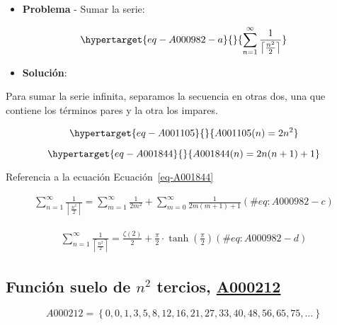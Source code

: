 \documentclass[
  letterpaper,
  DIV=11,
  numbers=noendperiod]{scrreprt}
\providecommand{\tightlist}{%
  \setlength{\itemsep}{0pt}\setlength{\parskip}{0pt}}\usepackage{longtable,booktabs,array}
\begin{document}
\begin{itemize}
\tightlist
\item
  \textbf{Problema} - Sumar la serie:
\end{itemize}

\begin{equation}\protect\hypertarget{eq-A000982-a}{}{
\sum_{n=1}^{\infty}{\frac{1}{\left\lceil  \frac{n^2}{2} \right\rceil}}
}\label{eq-A000982-a}\end{equation}

\begin{itemize}
\tightlist
\item
  \textbf{Solución}:
\end{itemize}

Para sumar la serie infinita, separamos la secuencia en otras dos, una
que contiene los términos pares y la otra los impares.

\begin{equation}\protect\hypertarget{eq-A001105}{}{
A001105(n) = 2n^2
}\label{eq-A001105}\end{equation}

\begin{equation}\protect\hypertarget{eq-A001844}{}{
A001844(n) = 2n(n+1) + 1
}\label{eq-A001844}\end{equation}

Referencia a la ecuación Ecuación~\ref{eq-A001844}

\begin{multline}
\sum_{n=1}^{\infty}{\frac{1}{\left\lceil \frac{n^2}{2} \right\rceil}} =  \sum_{m=1}^{\infty}{\frac{1}{2m^2}}  + \sum_{m=0}^{\infty}{\frac{1}{2m(m+1) + 1}} 
  (\#eq:A000982-c)
\end{multline}

\begin{multline}
\sum_{n=1}^{\infty}{\frac{1}{\left\lceil \frac{n^2}{2} \right\rceil}} =  \frac{\zeta(2)}{2} + \frac{\pi}{2} \cdot \tanh\left(\frac{\pi}{2}\right)
  (\#eq:A000982-d)
\end{multline}

\hypertarget{funciuxf3n-suelo-de-n2-tercios-a000212}{%
\subsection{\texorpdfstring{Función suelo de \(n^2\) tercios,
\href{https://oeis.org/A000212}{A000212}}{Función suelo de n\^{}2 tercios, A000212}}\label{funciuxf3n-suelo-de-n2-tercios-a000212}}

\[A000212 = \left\{ 0, 0, 1, 3, 5, 8, 12, 16, 21, 27, 33, 40, 48, 56, 65, 75 , \dots \right\}\]
\end{document}
